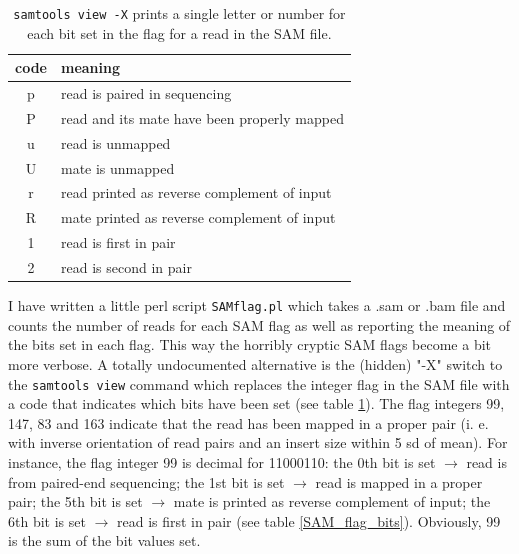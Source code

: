 \documentclass{article}\usepackage[]{graphicx}\usepackage[]{color}
\begin{document}
\begin{table}
\caption{\texttt{samtools view -X} prints a single letter or number for each bit set in the flag for a read in the SAM file.}
\centering
\begin{tabular}{cl}
\toprule
code & meaning \\
\midrule
p & read is paired in sequencing \\
P & read and its mate have been properly mapped \\
u & read is unmapped \\
U & mate is unmapped \\
r & read printed as reverse complement of input \\
R & mate printed as reverse complement of input \\
1 & read is first in pair \\
2 & read is second in pair \\
\bottomrule
\end{tabular}
\label{samtools_view_X}
\end{table}

I have written a little perl script \texttt{SAMflag.pl} which takes a .sam or .bam file and counts the number of reads for each SAM flag as well as reporting the meaning of the bits set in each flag. This way the horribly cryptic SAM flags become a bit more verbose. A totally undocumented alternative is the (hidden) "-X" switch to the \texttt{samtools view} command which replaces the integer flag in the SAM file with a code that indicates which bits have been set (see table \ref{samtools_view_X}). The flag integers 99, 147, 83 and 163 indicate that the read has been mapped in a proper pair (i. e. with inverse orientation of read pairs and an insert size within 5 sd of mean). For instance, the flag integer 99 is decimal for 11000110: the 0th bit is set $\rightarrow$ read is from paired-end sequencing; the 1st bit is set $\rightarrow$ read is mapped in a proper pair; the 5th bit is set $\rightarrow$ mate is printed as reverse complement of input; the 6th bit is set $\rightarrow$ read is first in pair (see table \ref{SAM_flag_bits}). Obviously, 99 is the sum of the bit values set.
\end{document}
